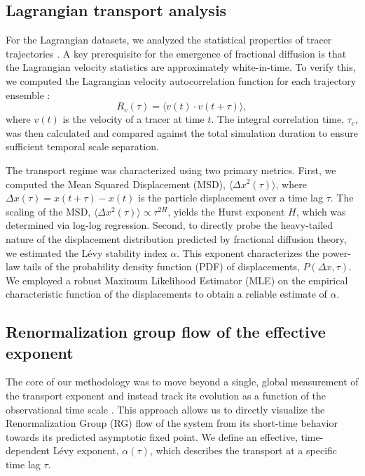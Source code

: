 \documentclass[]{article}
\begin{document}
\subsection{Lagrangian transport analysis}
For the Lagrangian datasets, we analyzed the statistical properties of tracer trajectories \citep{biferale2024turblagrdatabase3dlagrangian}. A key prerequisite for the emergence of fractional diffusion is that the Lagrangian velocity statistics are approximately white-in-time. To verify this, we computed the Lagrangian velocity autocorrelation function for each trajectory ensemble \citep{dewit2026datadrivenmorizwanzigmodelinglagrangian}:
\begin{equation}R_v(\tau) = \langle v(t) \cdot v(t+\tau) \rangle,\end{equation}
where $v(t)$ is the velocity of a tracer at time $t$. The integral correlation time, $\tau_c$, was then calculated and compared against the total simulation duration to ensure sufficient temporal scale separation.

The transport regime was characterized using two primary metrics. First, we computed the Mean Squared Displacement (MSD), $\langle \Delta x^2(\tau) \rangle$, where $\Delta x(\tau) = x(t+\tau) - x(t)$ is the particle displacement over a time lag $\tau$. The scaling of the MSD, $\langle \Delta x^2(\tau) \rangle \propto \tau^{2H}$, yields the Hurst exponent $H$, which was determined via log-log regression. Second, to directly probe the heavy-tailed nature of the displacement distribution predicted by fractional diffusion theory, we estimated the Lévy stability index $\alpha$. This exponent characterizes the power-law tails of the probability density function (PDF) of displacements, $P(\Delta x, \tau)$. We employed a robust Maximum Likelihood Estimator (MLE) on the empirical characteristic function of the displacements to obtain a reliable estimate of $\alpha$.

\subsection{Renormalization group flow of the effective exponent}
The core of our methodology was to move beyond a single, global measurement of the transport exponent and instead track its evolution as a function of the observational time scale \citep{bouchara2015anomaloustransportobservableaverage}. This approach allows us to directly visualize the Renormalization Group (RG) flow of the system from its short-time behavior towards its predicted asymptotic fixed point. We define an effective, time-dependent Lévy exponent, $\alpha(\tau)$, which describes the transport at a specific time lag $\tau$.
\end{document}
